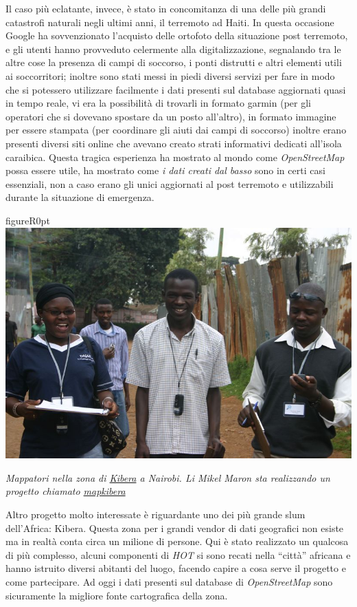 \documentclass[a4paper,twoside,12pt,]{article}
\newcommand{\osm}{\emph{OpenStreetMap}\xspace}
\newcommand{\pro}[1]{\emph{#1}}
\begin{document}
Il caso più eclatante, invece, è stato in concomitanza di una delle più grandi catastrofi naturali negli ultimi anni, il terremoto ad Haiti. In questa occasione Google ha sovvenzionato l'acquisto delle ortofoto della situazione post terremoto, e gli utenti hanno provveduto celermente alla digitalizzazione, segnalando tra le altre cose la presenza di campi di soccorso, i ponti distrutti e altri elementi utili ai soccorritori; inoltre sono stati messi in piedi diversi servizi per fare in modo che si potessero utilizzare facilmente i dati presenti sul database aggiornati quasi in tempo reale, vi era la possibilità di trovarli in formato garmin (per gli operatori che si dovevano spostare da un posto all'altro), in formato immagine per essere stampata (per coordinare gli aiuti dai campi di soccorso) inoltre erano presenti diversi siti online che avevano creato strati informativi dedicati all'isola caraibica. Questa tragica esperienza ha mostrato al mondo come \osm possa essere utile, ha mostrato come \textit{i dati creati dal basso} sono in certi casi essenziali, non a caso erano gli unici aggiornati al post terremoto e utilizzabili durante la situazione di emergenza.

\begin{wrapfloat}{figure}{R}{0pt}
 \includegraphics[width=0.65\columnwidth]{mapkibera.jpg}
 \caption{\textit{Mappatori nella zona di \href{http://www.openstreetmap.org/?lat=-1.31133&lon=36.7878&zoom=15&layers=B000FTF}{Kibera} a Nairobi. Li Mikel Maron sta realizzando un progetto chiamato \href{http://mapkibera.org/}{mapkibera}}}
\end{wrapfloat}Altro progetto molto interessate è riguardante uno dei più grande slum dell'Africa: Kibera.\newline
Questa zona per i grandi vendor di dati geografici non esiste ma in realtà conta circa un milione di persone. Qui è stato realizzato un qualcosa di più complesso, alcuni componenti di \pro{HOT} si sono recati nella ``città'' africana e hanno istruito diversi abitanti del luogo, facendo capire a cosa serve il progetto e come partecipare. Ad oggi i dati presenti sul database di \osm sono sicuramente la migliore fonte cartografica della zona.
\end{document}
